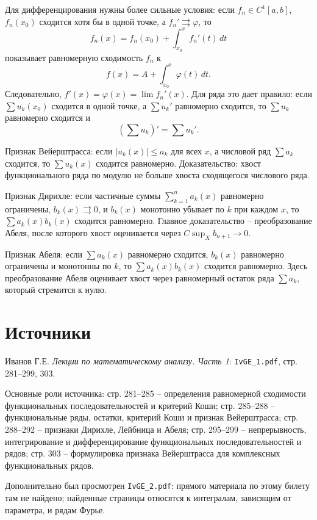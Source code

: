 \documentclass[12pt,a4paper]{article}
\newcommand{\dd}{\,d}
\begin{document}
Для дифференцирования нужны более сильные условия: если \(f_n\in C^1[a,b]\),
\(f_n(x_0)\) сходится хотя бы в одной точке, а \(f_n'\rightrightarrows\varphi\),
то
\[
  f_n(x)=f_n(x_0)+\int_{x_0}^x f_n'(t)\dd t
\]
показывает равномерную сходимость \(f_n\) к
\[
  f(x)=A+\int_{x_0}^x\varphi(t)\dd t.
\]
Следовательно, \(f'(x)=\varphi(x)=\lim f_n'(x)\). Для ряда это дает правило:
если \(\sum u_k(x_0)\) сходится в одной точке, а \(\sum u_k'\) равномерно
сходится, то \(\sum u_k\) равномерно сходится и
\[
  \left(\sum u_k\right)'=\sum u_k'.
\]

Признак Вейерштрасса: если \(|u_k(x)|\le a_k\) для всех \(x\), а числовой ряд
\(\sum a_k\) сходится, то \(\sum u_k(x)\) сходится равномерно. Доказательство:
хвост функционального ряда по модулю не больше хвоста сходящегося числового
ряда.

Признак Дирихле: если частичные суммы \(\sum_{k=1}^n a_k(x)\) равномерно
ограничены, \(b_k(x)\rightrightarrows0\), и \(b_k(x)\) монотонно убывает по
\(k\) при каждом \(x\), то \(\sum a_k(x)b_k(x)\) сходится равномерно. Главное
доказательство -- преобразование Абеля, после которого хвост оценивается
через \(C\sup_X b_{n+1}\to0\).

Признак Абеля: если \(\sum a_k(x)\) равномерно сходится, \(b_k(x)\)
равномерно ограничены и монотонны по \(k\), то \(\sum a_k(x)b_k(x)\) сходится
равномерно. Здесь преобразование Абеля оценивает хвост через равномерный
остаток ряда \(\sum a_k\), который стремится к нулю.

\section*{Источники}

Иванов Г.Е. \emph{Лекции по математическому анализу. Часть 1}:
\texttt{IvGE\_1.pdf}, стр. 281--299, 303.

Основные роли источника: стр. 281--285 -- определения равномерной сходимости
функциональных последовательностей и критерий Коши; стр. 285--288 --
функциональные ряды, остатки, критерий Коши и признак Вейерштрасса; стр.
288--292 -- признаки Дирихле, Лейбница и Абеля; стр. 295--299 --
непрерывность, интегрирование и дифференцирование функциональных
последовательностей и рядов; стр. 303 -- формулировка признака Вейерштрасса
для комплексных функциональных рядов.

Дополнительно был просмотрен \texttt{IvGE\_2.pdf}: прямого материала по
этому билету там не найдено; найденные страницы относятся к интегралам,
зависящим от параметра, и рядам Фурье.
\end{document}
